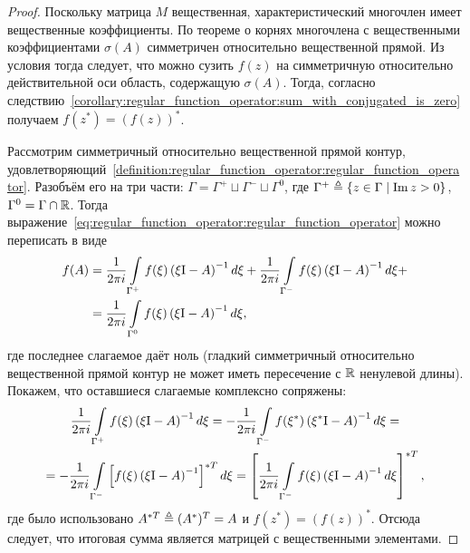 \begin{proof}
    Поскольку матрица $ M $ вещественная,
    характеристический многочлен имеет вещественные коэффициенты.
    По теореме о корнях многочлена с вещественными коэффициентами
    $ \sigma(A) $ симметричен относительно вещественной прямой.
    Из условия тогда следует, что можно сузить $ f(z) $
    на симметричную относительно действительной оси область,
    содержащую $ \sigma(A) $.
    Тогда, согласно следствию~\ref{corollary:regular_function_operator:sum_with_conjugated_is_zero}
    получаем $ f(z^*) = (f(z))^* $.

    Рассмотрим симметричный относительно вещественной прямой контур,
    удовлетворяющий~\ref{definition:regular_function_operator:regular_function_operator}.
    Разобъём его на три части: $ \Gamma = \Gamma^+ \sqcup \Gamma^- \sqcup \Gamma^0 $,
    где $ \Gamma^+ \triangleq \{ z \in \Gamma \mid \operatorname{Im} z > 0 \} $, $ \Gamma^0 = \Gamma \cap \mathbb{R} $.
    Тогда выражение~\eqref{eq:regular_function_operator:regular_function_operator} можно переписать в виде
    \begin{align*}
        f(A) &= \frac{1}{2 \pi i} \int\limits_{\Gamma^+} f(\xi) \left( \xi \mathrm{I} - A \right)^{-1} d \xi +
                \frac{1}{2 \pi i} \int\limits_{\Gamma^-} f(\xi) \left( \xi \mathrm{I} - A \right)^{-1} d \xi + \\
             &= \frac{1}{2 \pi i} \int\limits_{\Gamma^0} f(\xi) \left( \xi \mathrm{I} - A \right)^{-1} d \xi,
    \end{align*}
    где последнее слагаемое даёт ноль
    (гладкий симметричный относительно вещественной прямой контур не может иметь пересечение с $ \mathbb{R} $ ненулевой длины).
    Покажем, что оставшиеся слагаемые комплексно сопряжены:
    \begin{multline*}
        \frac{1}{2 \pi i} \int\limits_{\Gamma^+} f(\xi) \left( \xi \mathrm{I} - A \right)^{-1} d \xi =
        -\frac{1}{2 \pi i} \int\limits_{\Gamma^-} f(\xi^*) \left( \xi^* \mathrm{I} - A \right)^{-1} d \xi = \\ =
        -\frac{1}{2 \pi i} \int\limits_{\Gamma^-} \left[ f(\xi) \left( \xi \mathrm{I} - A \right)^{-1} \right]^{*T} d \xi =
        \left[ \frac{1}{2 \pi i} \int\limits_{\Gamma^-} f(\xi) \left( \xi \mathrm{I} - A \right)^{-1} d \xi \right]^{*T},
    \end{multline*}
    где было использовано $ A^{*T} \triangleq (A^*)^T = A $ и $ f(z^*) = (f(z))^* $.
    Отсюда следует, что итоговая сумма является матрицей с вещественными элементами.
\end{proof}




